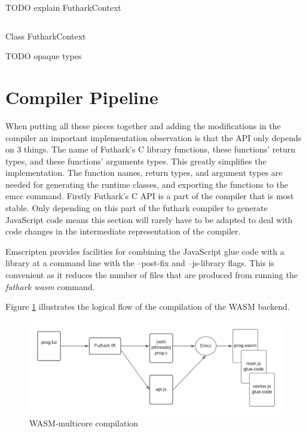 \documentclass[11pt]{book}
\begin{document}
TODO explain FutharkContext

\begin{listing}[H] 
        \inputminted[fontsize=\small,baselinestretch=0.5,linenos]{JavaScript}{code/compiler/api_examples/FutharkContext.js}
        \caption{Class FutharkContext}
        \label{lst:FutharkContext}    
\end{listing} 

TODO opaque types


\section{Compiler Pipeline}

When putting all these pieces together and adding the modifications in the compiler an important implementation observation is that the API only depends on 3 things. The name of Futhark's C library functions, these functions' return types, and these functions' arguments types. This greatly simplifies the implementation. The function names, return types, and argument types are needed for generating the runtime classes, and exporting the functions to the emcc command. Firstly Futhark's C API is a part of the compiler that is most stable. Only depending on this part of the futhark compiler to generate JavaScript code means this section will rarely have to be adapted to deal with code changes in the intermediate representation of the compiler.


Emscripten provides facilities for combining the JavaScript glue code with a library at a command line with the --post-fix and --js-library flags. This is convenient as it reduces the number of files that are produced from running the \textit{futhark wasm} command.



Figure \ref{fig:wasm} illustrates the logical flow of the compilation of the WASM backend. 

\begin{figure}[htbp]
\centerline{\includegraphics[width=\textwidth]{figures/WASM_MC_compiler.png}}
\caption{WASM-multicore compilation}
\label{fig:wasm}
\end{figure}
\end{document}
